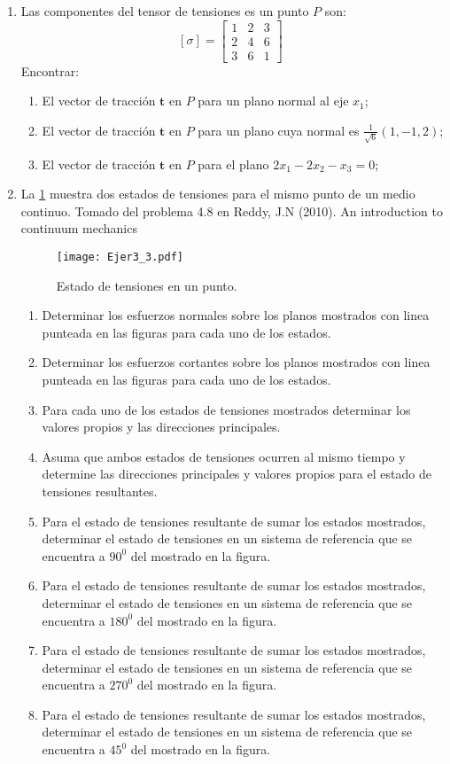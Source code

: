 \documentclass[../notas medios.tex]{subfiles}
\begin{document}
\begin{enumerate}


\item \label{punto02} Las componentes del tensor de tensiones es un punto $P$
son:
		\[{[\sigma]} = \left[ \begin{array}{ccc}
		1 & 2 & 3 \\ 
		2 & 4 & 6 \\ 
		3 & 6 & 1
		\end{array}  \right] \enspace\]
%
Encontrar:
%
\begin{enumerate}
	\item El vector de tracci\'on $\mathbf{t}$ en $P$ para un plano normal al eje $x_1$;
	\item El vector de tracci\'on $\mathbf{t}$ en $P$ para un plano cuya normal es $\frac{1}{\sqrt{6}}(1,-1,2)$;
	\item El vector de tracci\'on $\mathbf{t}$ en $P$ para el plano $2x_1 - 2x_2 - x_3 = 0$;
\end{enumerate}

\item \label{punto03} La  \cref{planos} muestra dos estados de tensiones
para el mismo punto de un medio continuo. {Tomado del problema 4.8 en Reddy, J.N (2010). An introduction to continuum mechanics}
%
\begin{figure}[H]
	\centering
	\texttt{[image: Ejer3\_3.pdf]}
	\caption{Estado de tensiones en un punto.}
	\label{planos}
\end{figure}
\begin{enumerate}
	\item Determinar los esfuerzos normales sobre los planos mostrados con linea punteada en las figuras para cada uno de los estados.
	\item Determinar los esfuerzos cortantes sobre los planos mostrados con linea punteada en las figuras para cada uno de los estados.
	\item Para cada uno de los estados de tensiones mostrados determinar los valores propios y las direcciones principales.
	\item Asuma que ambos estados de tensiones ocurren al mismo tiempo y determine las direcciones principales y valores propios para el estado de tensiones resultantes.
	\item Para el estado de tensiones resultante de sumar los estados mostrados, determinar el estado de tensiones en un sistema de referencia que se encuentra a $90^0$ del mostrado en la figura.
	\item Para el estado de tensiones resultante de sumar los estados mostrados, determinar el estado de tensiones en un sistema de referencia que se encuentra a $180^0$ del mostrado en la figura.
	\item Para el estado de tensiones resultante de sumar los estados mostrados, determinar el estado de tensiones en un sistema de referencia que se encuentra a $270^0$ del mostrado en la figura.
	\item Para el estado de tensiones resultante de sumar los estados mostrados, determinar el estado de tensiones en un sistema de referencia que se encuentra a $45^0$ del mostrado en la figura.
\end{enumerate}



\end{enumerate}
\end{document}

